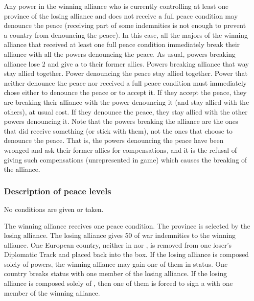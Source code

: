 \aparag[Disagreement] Any power in the winning alliance who is currently
controlling at least one province of the losing alliance and does not receive
a full peace condition may denounce the peace (receiving part of some
indemnities is not enough to prevent a country from denouncing the peace).
\bparag In this case, all the majors of the winning alliance that received at
least one full peace condition immediately break their alliance with all the
powers denouncing the peace.
\bparag As usual, powers breaking alliance lose 2 \STAB and give a \CB to
their former allies.
\bparag Powers breaking alliance that way stay allied together. Power
denouncing the peace stay allied together.
\bparag Power that neither denounce the peace nor received a full peace
condition must immediately chose either to denounce the peace or to accept
it.
\bparag If they accept the peace, they are breaking their alliance with the
power denouncing it (and stay allied with the others), at usual cost.
\bparag If they denounce the peace, they stay allied with the other powers
denouncing it.
\bparag Note that the powers breaking the alliance are the ones that did
receive something (or stick with them), not the ones that choose to denounce
the peace. That is, the powers denouncing the peace have been wronged and ask
their former allies for compensations, and it is the refusal of giving such
compensations (unrepresented in game) which causes the breaking of the
alliance.

\subsubsection{Description of peace levels}
 No conditions are given or taken.

 The winning alliance receives one peace condition.
 The province is selected by the losing
alliance.
\bparag[Indemnities] The losing alliance gives 50 \ducats of war indemnities
to the winning alliance.
 One European country, neither in
\VASSAL nor \ANNEXION, is removed from one loser's Diplomatic Track and placed
back into the \Neutral box. If the losing alliance is composed solely of \MIN
powers, the winning alliance may gain one of them in \MR status.
 One \ROTW country breaks \dipFR status
with one member of the losing alliance. If the losing alliance is composed
solely of \MIN, then one of them is forced to sign a \dipFR with one member of
the winning alliance.

